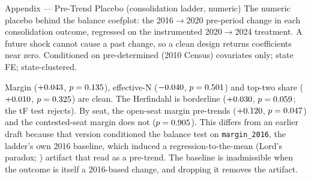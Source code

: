 
\begin{frame}{Appendix --- Pre-Trend Placebo (consolidation ladder, numeric)}
\hypertarget{app:pretrend}{}
\small
The numeric placebo behind the balance coefplot: the 2016$\to$2020 pre-period change in each consolidation outcome, regressed on the instrumented 2020$\to$2024 treatment. A future shock cannot cause a past change, so a clean design returns coefficients near zero. Conditioned on pre-determined (2010 Census) covariates only; state FE; state-clustered.
\smallskip
\begin{center}
\scriptsize
\resizebox{\linewidth}{!}{}
\end{center}
\smallskip
\footnotesize Margin ($+0.043$, $p=0.135$), effective-N ($-0.040$, $p=0.501$) and top-two share ($+0.010$, $p=0.325$) are clean. The Herfindahl is borderline ($+0.030$, $p=0.059$; the tF test rejects). By seat, the open-seat margin pre-trends ($+0.120$, $p=0.047$) and the contested-seat margin does not ($p=0.905$). This differs from an earlier draft because that version conditioned the balance test on \texttt{margin\_2016}, the ladder's own 2016 baseline, which induced a regression-to-the-mean (Lord's paradox; \citealp{lord1967}) artifact that read as a pre-trend. The baseline is inadmissible when the outcome is itself a 2016-based change, and dropping it removes the artifact. \hfill\hyperlink{src:pretrend}{}
\end{frame}
